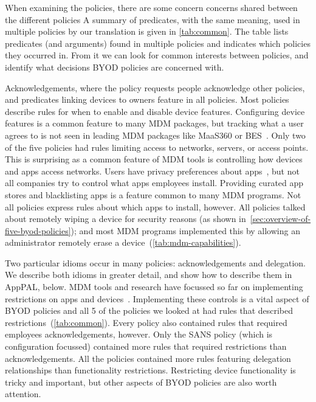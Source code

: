 \documentclass[thesis.tex]{subfiles}
\begin{document}
When examining the policies, there are some concern concerns shared
between the different policies A summary of predicates, with the same
meaning, used in multiple policies by our translation is given in
\autoref{tab:common}.  The table lists predicates (and arguments)
found in multiple policies and indicates which policies they occurred
in.  From it we can look for common interests between policies, and
identify what decisions \ac{BYOD} policies are concerned with.

Acknowledgements, where the policy requests people acknowledge other
policies, and predicates linking devices to owners feature in all
policies.  Most policies describe rules for when to enable and disable
device features.  Configuring device features is a common feature to
many \ac{MDM} packages, but tracking what a user agrees to is not seen
in leading \ac{MDM} packages like MaaS360 or
BES~\cite{rob_smith_magic_2016}.  Only two of the five policies had
rules limiting access to networks, servers, or access points. This is
surprising as a common feature of \ac{MDM} tools is controlling how
devices and apps access networks.  Users have privacy preferences
about apps~\cite{lin_modeling_2014}, but not all companies try to
control what apps employees install.  Providing curated app stores and
blacklisting apps is a feature common to many \ac{MDM} programs.  Not
all policies express rules about which apps to install, however.  All
policies talked about remotely wiping a device for security reasons
(as shown in~\autoref{sec:overview-of-five-byod-policies}); and most
\ac{MDM} programs implemented this by allowing an administrator
remotely erase a device~(\autoref{tab:mdm-capabilities}).

Two particular idioms occur in many policies: acknowledgements and
delegation.  We describe both idioms in greater detail, and show how
to describe them in AppPAL, below.  MDM tools and research have
focussed so far on implementing restrictions on apps and
devices~\cite{ibm_ibm_nodate,armando_formal_2014,martinelli_enhancing_2016}.
Implementing these controls is a vital aspect of BYOD policies and all
5 of the policies we looked at had rules that described
restrictions~(\autoref{tab:common}).  Every policy also contained
rules that required employees acknowledgements, however.  Only the
SANS policy (which is configuration focussed) contained more rules
that required restrictions than acknowledgements.  All the policies
contained more rules featuring delegation relationships than
functionality restrictions.  Restricting device functionality is
tricky and important, but other aspects of BYOD policies are also
worth attention.
\end{document}
